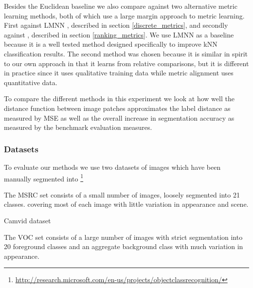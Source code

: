 Besides the Euclidean baseline we also compare against two alternative metric learning methods, both of which use a large margin approach to metric learning. First against \ac{LMNN} \cite{weinberger2009distance}, described in section \ref{discrete_metrics}, and secondly against \cite{schultz2003learning}, described in section \ref{ranking_metrics}. We use \ac{LMNN} as a baseline because it is a well tested method designed specifically to improve \ac{kNN} classification results. The second method was chosen because it is similar in spirit to our own approach in that it learns from relative comparisons, but it is different in practice since it uses qualitative training data while metric alignment uses quantitative data.

To compare the different methods in this experiment we look at how well the distance function between image patches approximates the label distance as measured by \ac{MSE} as well as the overall increase in segmentation accuracy as measured by the benchmark evaluation measures.



\subsubsection{Datasets}

To evaluate our methods we use two datasets of images which have been manually segmented into  \footnote{\url{http://research.microsoft.com/en-us/projects/objectclassrecognition/}}

The MSRC set consists of a small number of images, loosely segmented into 21 classes. covering most of each image with little variation in appearance and scene.

Camvid dataset

The VOC set consists of a large number of images with strict segmentation into 20 foreground classes and an aggregate background class with much variation in appearance. %

